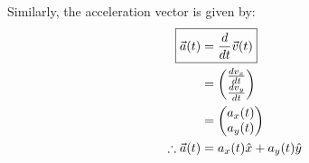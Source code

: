 Similarly, the acceleration vector is given by:
\begin{align}
\label{eqn:describingmotioninnd:avecdef}
\Aboxed{\vec a(t) &= \frac{d}{dt}\vec v(t)} \\
&=\begin{pmatrix}
           \frac{dv_x}{dt}  \\
          \frac{dv_y}{dt}  \\
         \end{pmatrix}\nonumber\\
&=\begin{pmatrix}
           a_x(t) \\
           a_y(t) \\
         \end{pmatrix}\nonumber\\
\therefore \vec a(t) &= a_x(t)\hat x+a_y(t)\hat y      \nonumber        
\end{align}


